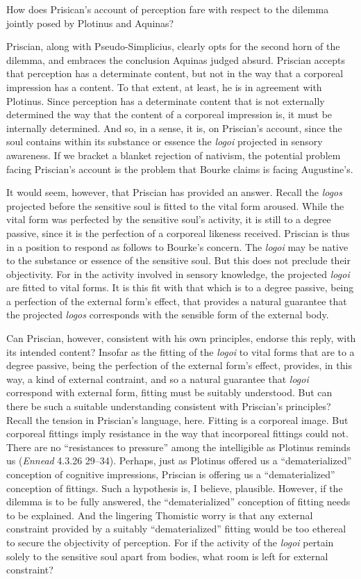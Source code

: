 \documentclass[12pt]{article}
\begin{document}
How does Prisican's account of perception fare with respect to the dilemma jointly posed by Plotinus and Aquinas?

Priscian, along with Pseudo-Simplicius, clearly opts for the second horn of the dilemma, and embraces the conclusion Aquinas judged absurd. Priscian accepts that perception has a determinate content, but not in the way that a corporeal impression has a content. To that extent, at least, he is in agreement with Plotinus. Since perception has a determinate content that is not externally determined the way that the content of a corporeal impression is, it must be internally determined. And so, in a sense, it is, on Priscian's account, since the soul contains within its substance or essence the \emph{logoi} projected in sensory awareness. If we bracket a blanket rejection of nativism, the potential problem facing Priscian's account is the problem that Bourke claims is facing Augustine's.

It would seem, however, that Priscian has provided an answer. Recall the \emph{logos} projected before the sensitive soul is fitted to the vital form aroused. While the vital form was perfected by the sensitive soul's activity, it is still to a degree passive, since it is the perfection of a corporeal likeness received. Priscian is thus in a position to respond as follows to Bourke's concern. The \emph{logoi} may be native to the substance or essence of the sensitive soul. But this does not preclude their objectivity. For in the activity involved in sensory knowledge, the projected \emph{logoi} are fitted to vital forms. It is this fit with that which is to a degree passive, being a perfection of the external form's effect, that provides a natural guarantee that the projected \emph{logos} corresponds with the sensible form of the external body.

Can Priscian, however, consistent with his own principles, endorse this reply, with its intended content? Insofar as the fitting of the \emph{logoi} to vital forms that are to a degree passive, being the perfection of the external form's effect, provides, in this way, a kind of external contraint, and so a natural guarantee that \emph{logoi} correspond with external form, fitting must be suitably understood. But can there be such a suitable understanding consistent with Priscian's principles? Recall the tension in Priscian's language, here. Fitting is a corporeal image. But corporeal fittings imply resistance in the way that incorporeal fittings could not. There are no ``resistances to pressure'' among the intelligible as Plotinus reminds us (\emph{Ennead} 4.3.26 29--34). Perhaps, just as Plotinus offered us a ``dematerialized'' conception of cognitive impressions, Priscian is offering us a ``dematerialized'' conception of fittings. Such a hypothesis is, I believe, plausible. However, if the dilemma is to be fully answered, the ``dematerialized'' conception of fitting needs to be explained. And the lingering Thomistic worry is that any external constraint provided by a suitably ``dematerialized'' fitting would be too ethereal to secure the objectivity of perception. For if the activity of the \emph{logoi} pertain solely to the sensitive soul apart from bodies, what room is left for external constraint?






\end{document}
